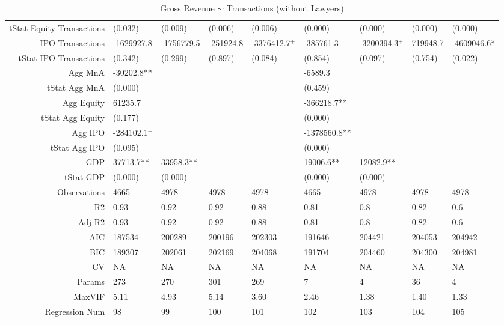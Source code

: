 \begin{table}[ht]
\begin{tabular}{rllllllll}
  tStat Equity Transactions & (0.032) & (0.009) & (0.006) & (0.006) & (0.000) & (0.000) & (0.000) & (0.000) \\ 
  IPO Transactions & -1629927.8 & -1756779.5 & -251924.8 & -3376412.7$^{+}$ & -385761.3 & -3200394.3$^{+}$ & 719948.7 & -4609046.6* \\ 
  tStat IPO Transactions & (0.342) & (0.299) & (0.897) & (0.084) & (0.854) & (0.097) & (0.754) & (0.022) \\ 
  Agg MnA & -30202.8** &  &  &  & -6589.3 &  &  &  \\ 
  tStat Agg MnA & (0.000) &  &  &  & (0.459) &  &  &  \\ 
  Agg Equity & 61235.7 &  &  &  & -366218.7** &  &  &  \\ 
  tStat Agg Equity & (0.177) &  &  &  & (0.000) &  &  &  \\ 
  Agg IPO & -284102.1$^{+}$ &  &  &  & -1378560.8** &  &  &  \\ 
  tStat Agg IPO & (0.095) &  &  &  & (0.000) &  &  &  \\ 
  GDP & 37713.7** & 33958.3** &  &  & 19006.6** & 12082.9** &  &  \\ 
  tStat GDP & (0.000) & (0.000) &  &  & (0.000) & (0.000) &  &  \\ 
  Observations & 4665 & 4978 & 4978 & 4978 & 4665 & 4978 & 4978 & 4978 \\ 
  R2 & 0.93 & 0.92 & 0.92 & 0.88 & 0.81 & 0.8 & 0.82 & 0.6 \\ 
  Adj R2 & 0.93 & 0.92 & 0.92 & 0.88 & 0.81 & 0.8 & 0.82 & 0.6 \\ 
  AIC & 187534 & 200289 & 200196 & 202303 & 191646 & 204421 & 204053 & 204942 \\ 
  BIC & 189307 & 202061 & 202169 & 204068 & 191704 & 204460 & 204300 & 204981 \\ 
  CV & NA & NA & NA & NA & NA & NA & NA & NA \\ 
  Params & 273 & 270 & 301 & 269 & 7 & 4 & 36 & 4 \\ 
  MaxVIF & 5.11 & 4.93 & 5.14 & 3.60 & 2.46 & 1.38 & 1.40 & 1.33 \\ 
  Regression Num & 98 & 99 & 100 & 101 & 102 & 103 & 104 & 105 \\ 
   \hline
\end{tabular}
\caption{Gross Revenue $\sim$ Transactions (without Lawyers)} 
\end{table}
